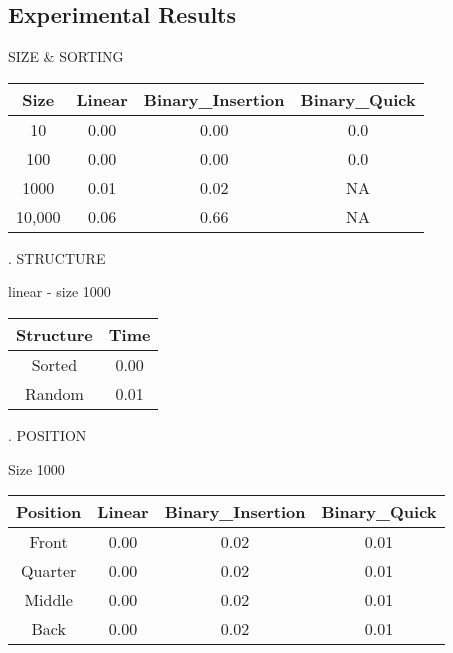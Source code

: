\documentclass{article}
\begin{document}
\subsection{Experimental Results}

SIZE \& SORTING\newline


\begin{center}
 \begin{tabular}{||c c c c||}
 \hline
 Size & Linear & Binary\_Insertion &  Binary\_Quick \\
 \hline\hline
 10 & 0.00 & 0.00 & 0.0 \\
 \hline
 100 & 0.00 & 0.00 & 0.0 \\
 \hline
 1000 & 0.01 & 0.02 & NA \\
 \hline
 10,000 & 0.06 & 0.66 & NA \\
 \hline
\end{tabular}
\end{center}


.\newline
STRUCTURE\newline


linear - size 1000\newline


\begin{center}
\begin{tabular}{||c c||}
\hline
Structure & Time \\
\hline\hline
Sorted & 0.00  \\
\hline
Random & 0.01 \\
\hline
\end{tabular}
\end{center}
.\newline
POSITION\newline


Size 1000\newline

\begin{center}
 \begin{tabular}{||c c c c||}
 \hline
 Position & Linear & Binary\_Insertion &  Binary\_Quick \\ [0.5ex]
 \hline\hline
 Front & 0.00 & 0.02 & 0.01 \\
 \hline
 Quarter& 0.00 & 0.02 & 0.01 \\
 \hline
 Middle & 0.00 & 0.02 & 0.01 \\
 \hline
 Back & 0.00 & 0.02 & 0.01 \\
 \hline
\end{tabular}
\end{center}
\end{document}
